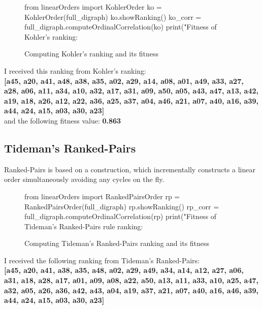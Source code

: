 \documentclass[a4paper]{article}
\begin{document}
\begin{figure}[H]
	\begin{center}
		\begin{python}
from linearOrders import KohlerOrder
ko = KohlerOrder(full_digraph)
ko.showRanking()
ko_corr = full_digraph.computeOrdinalCorrelation(ko)
print("Fitness of Kohler's ranking: %
		\end{python}
	\end{center}
	\caption{Computing Kohler's ranking and its fitness}
	\label{lst:kohler}
\end{figure}

I received this ranking from Kohler's ranking:\\

\textbf{[a45, a20, a41, a48, a38, a35, a02, a29, a14, a08, a01, a49, a33, a27, a28, a06, a11, a34, a10, a32, a17, a31, a09, a50, a05, a43, a47, a13, a42, a19, a18, a26, a12, a22, a36, a25, a37, a04, a46, a21, a07, a40, a16, a39, a44, a24, a15, a03, a30, a23]}\\

and the following fitness value: \textbf{0.863}

\subsection{Tideman's Ranked-Pairs}

Ranked-Pairs is based on a construction, which incrementally constructs a linear order simultaneously avoiding any cycles on the fly.

\begin{figure}[H]
	\begin{center}
		\begin{python}
from linearOrders import RankedPairsOrder
rp = RankedPairsOrder(full_digraph)
rp.showRanking()
rp_corr = full_digraph.computeOrdinalCorrelation(rp)
print("Fitness of Tideman's Ranked-Pairs rule ranking: %

		\end{python}
	\end{center}
	\caption{Computing Tideman's Ranked-Pairs ranking and its fitness}
	\label{lst:tideman}
\end{figure}


I received the following ranking from Tideman's Ranked-Pairs:\\

\textbf{[a45, a20, a41, a38, a35, a48, a02, a29, a49, a34, a14, a12, a27, a06, a31, a18, a28, a17, a01, a09, a08, a22, a50, a13, a11, a33, a10, a25, a47, a32, a05, a26, a36, a42, a43, a04, a19, a37, a21, a07, a40, a16, a46, a39, a44, a24, a15, a03, a30, a23]}\\
\end{document}
